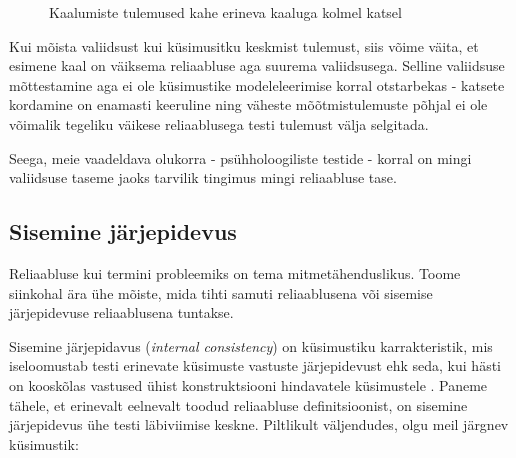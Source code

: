 \documentclass[a4paper,12pt,oneside]{article}
\numberwithin{equation}{section}
\theoremstyle{definition}
\begin{document}
\begin{figure}[H]
\colorbox{background_example}{\parbox{\textwidth}{
}}
\caption{Kaalumiste tulemused kahe erineva kaaluga kolmel katsel}
\end{figure}

Kui mõista valiidsust kui küsimusitku keskmist tulemust, siis võime väita, et esimene kaal on väiksema reliaabluse aga suurema valiidsusega. Selline valiidsuse mõttestamine aga ei ole küsimustike modeleleerimise korral otstarbekas - katsete kordamine on enamasti keeruline ning väheste mõõtmistulemuste põhjal ei ole võimalik tegeliku väikese reliaablusega testi tulemust välja selgitada. 

Seega, meie vaadeldava olukorra - psühholoogiliste testide - korral on mingi valiidsuse taseme jaoks tarvilik tingimus mingi reliaabluse tase.    


\subsection{Sisemine järjepidevus}

Reliaabluse kui termini probleemiks on tema mitmetähenduslikus. Toome siinkohal ära ühe mõiste,  mida tihti samuti reliaablusena või sisemise järjepidevuse reliaablusena tuntakse.

Sisemine järjepidavus (\textit{internal consistency}) on küsimustiku karrakteristik, mis iseloomustab testi erinevate k\"usimuste vastuste järjepidevust ehk seda, kui hästi on kooskõlas  vastused \"uhist  konstruktsiooni hindavatele k\"usimustele \cite[177] {Henson2001}. Paneme tähele, et erinevalt eelnevalt toodud reliaabluse definitsioonist, on sisemine järjepidevus ühe testi läbiviimise keskne. Piltlikult väljendudes, olgu meil järgnev k\"usimustik: 
\end{document}
